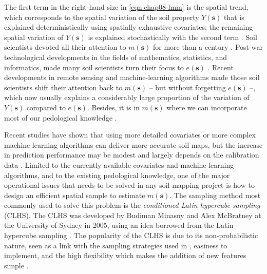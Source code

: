 \noindent The first term in the right-hand size in \autoref{eqn:chap08-lmm} is the spatial trend, 
which corresponds to the spatial variation of the soil property $Y(\boldsymbol{s})$ that is explained 
deterministically using spatially exhaustive covariates; the remaining spatial variation of 
$Y(\boldsymbol{s})$ is explained stochastically with the second term \cite{Cressie1993}. Soil scientists 
devoted all their attention to $m(\boldsymbol{s})$ for more than a century \cite{Jenny1961, Florinsky2012}. 
Post-war technological developments in the fields of mathematics, statistics, and informatics, made many soil 
scientists turn their focus to $e(\boldsymbol{s})$ \cite{WebsterEtAl1990}. Recent developments in remote 
sensing and machine-learning algorithms made those soil scientists shift their attention back to 
$m(\boldsymbol{s})$ \cite{MooreEtAl1993} -- but without forgetting $e(\boldsymbol{s})$ \cite{OdehEtAl1994} 
--, which now usually explains a considerably large proportion of the variation of $Y(\boldsymbol{s})$ 
compared to $e(\boldsymbol{s})$\footgerard. Besides, it is in $m(\boldsymbol{s})$ where we can incorporate 
most of our pedological knowledge \cite{Lark2012}.

Recent studies have shown that using more detailed covariates or more complex machine-learning algorithms can 
deliver more accurate soil maps, but the increase in prediction performance may be modest 
\cite{Samuel-RosaEtAl2015} and largely depends on the calibration data \cite{HeungEtAl2016}. Limited to the 
currently available covariates and machine-learning algorithms, and to the existing pedological knowledge, one 
of the major operational issues that needs to be solved in any soil mapping project is how to design an 
efficient spatial sample to estimate $m(\boldsymbol{s})$. The sampling method most commonly used to solve this 
problem is the \emph{conditioned Latin hypercube sampling} (CLHS). The CLHS was developed by Budiman Minasny 
and Alex McBratney at the University of Sydney in 2005, using an idea borrowed from the Latin hypercube 
sampling \cite{McKayEtAl1979, MinasnyEtAl2006b}. The popularity of the CLHS is due to its non-probabilistic 
nature, seen as a link with the sampling strategies used in , easiness to 
implement, and the high flexibility which makes the addition of new features simple \cite{MinasnyEtAl2010a, 
RoudierEtAl2012, MulderEtAl2013, CarvalhoJuniorEtAl2014, CliffordEtAl2014}.


